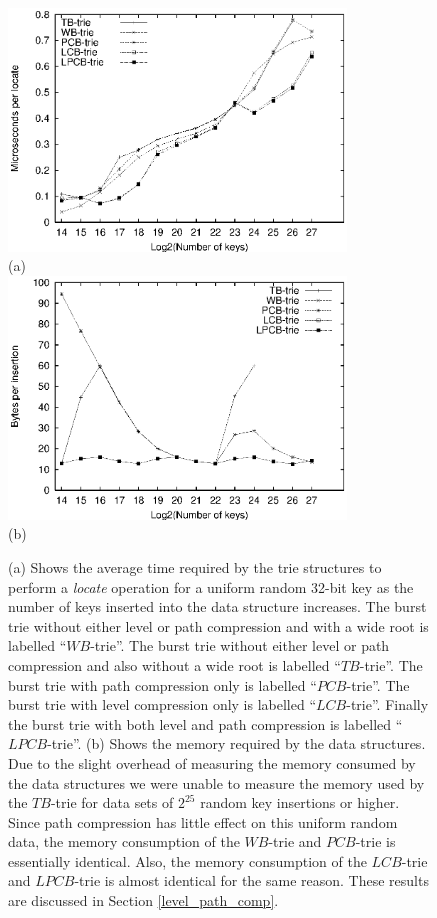 \documentclass[]{acmtrans2m}
\begin{document}
\begin{figure}
\center
\includegraphics[width=0.8\textwidth]{plots/burst_irandom_time_knuth.eps}\\
(a)\\
\includegraphics[width=0.8\textwidth]{plots/burst_irandom_mem_knuth.eps}\\
(b)
\caption{(a) Shows the average time required by the trie structures to perform a \textit{locate} operation for a uniform random 32-bit key
as the number of keys inserted into the data structure increases. 
The burst trie without either level or path compression and with a wide root is labelled ``$WB$-trie''. 
The burst trie without either level or path compression and also without a wide root is labelled ``$TB$-trie''.
The burst trie with path compression only is labelled ``$PCB$-trie''. The burst trie with level compression only is labelled ``$LCB$-trie''. Finally the burst trie with both level
and path compression is labelled ``$LPCB$-trie''. (b) Shows the memory required by the data structures.
Due to the slight overhead of measuring the memory consumed by the data structures we were unable to
measure the memory used by the $TB$-trie for data sets of $2^{25}$ random key insertions or higher.
Since path compression has little effect on this uniform random data, the memory consumption of the $WB$-trie and $PCB$-trie is essentially identical. Also, the memory consumption of the $LCB$-trie and $LPCB$-trie is almost identical
for the same reason. These results are discussed in Section \ref{level_path_comp}.}
\label{burst_trie_comparison_fig}
\end{figure}
\end{document}
